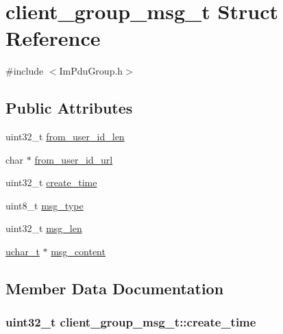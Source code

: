 \hypertarget{structclient__group__msg__t}{}\section{client\+\_\+group\+\_\+msg\+\_\+t Struct Reference}
\label{structclient__group__msg__t}


{\ttfamily \#include $<$Im\+Pdu\+Group.\+h$>$}

\subsection*{Public Attributes}
\begin{DoxyCompactItemize}
\item 
uint32\+\_\+t \hyperlink{structclient__group__msg__t_a6b3ef6bcda07d503f1389aebc629eaba}{from\+\_\+user\+\_\+id\+\_\+len}
\item 
char $\ast$ \hyperlink{structclient__group__msg__t_a5fd919a44eeb59799afda61b56533550}{from\+\_\+user\+\_\+id\+\_\+url}
\item 
uint32\+\_\+t \hyperlink{structclient__group__msg__t_a9bcddc5b523dd4dba5774ddf1f562441}{create\+\_\+time}
\item 
uint8\+\_\+t \hyperlink{structclient__group__msg__t_a6d4cb58988d4b9a1a462b4673c39a1ba}{msg\+\_\+type}
\item 
uint32\+\_\+t \hyperlink{structclient__group__msg__t_a984422309e3922e60cf633b7737537d9}{msg\+\_\+len}
\item 
\hyperlink{base_2ostype_8h_a124ea0f8f4a23a0a286b5582137f0b8d}{uchar\+\_\+t} $\ast$ \hyperlink{structclient__group__msg__t_a43a21a2c917a03ce7853022efa472355}{msg\+\_\+content}
\end{DoxyCompactItemize}


\subsection{Member Data Documentation}
\hypertarget{structclient__group__msg__t_a9bcddc5b523dd4dba5774ddf1f562441}{}
\subsubsection[{create\+\_\+time}]{\setlength{\rightskip}{0pt plus 5cm}uint32\+\_\+t client\+\_\+group\+\_\+msg\+\_\+t\+::create\+\_\+time}\label{structclient__group__msg__t_a9bcddc5b523dd4dba5774ddf1f562441}
\hypertarget{structclient__group__msg__t_a6b3ef6bcda07d503f1389aebc629eaba}{}
